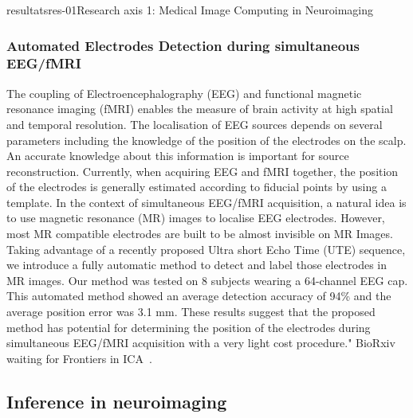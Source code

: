 \documentclass{ra2018}
\begin{document}
\begin{module}{resultats}{res-01}{Research axis 1: Medical Image Computing in Neuroimaging}
\subsubsection{Automated Electrodes Detection during simultaneous EEG/fMRI}
\begin{participants}
\end{participants}
The coupling of Electroencephalography (EEG) and functional magnetic resonance imaging (fMRI) enables the measure of brain activity at high spatial and temporal resolution. The localisation of EEG sources depends on several parameters including the knowledge of the position of the electrodes on the scalp. An accurate knowledge about this information is important for source reconstruction. Currently, when acquiring EEG and fMRI together, the position of the electrodes is generally estimated according to fiducial points by using a template. In the context of simultaneous EEG/fMRI acquisition, a natural idea is to use magnetic resonance (MR) images to localise EEG electrodes. However, most MR compatible electrodes are built to be almost invisible on MR Images. Taking advantage of a recently proposed Ultra short Echo Time (UTE) sequence, we introduce a fully automatic method to detect and label those electrodes in MR images. Our method was tested on 8 subjects wearing a 64-channel EEG cap. This automated method showed an average detection accuracy of 94\% and the average position error was 3.1 mm. These results suggest that the proposed method has potential for determining the position of the electrodes during simultaneous EEG/fMRI acquisition with a very light cost procedure." BioRxiv waiting for Frontiers in ICA~\cite{fleury:hal-01939735}.

\subsection{Inference in neuroimaging}

\end{module}
\end{document}
